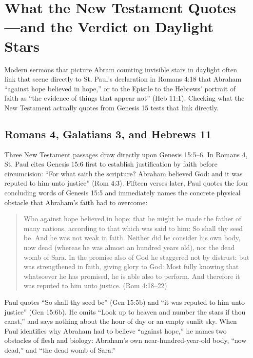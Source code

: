 \section{What the New Testament Quotes---and the Verdict on Daylight Stars}

Modern sermons that picture Abram counting invisible stars in daylight often link that scene directly to St. Paul's declaration in Romans 4:18 that Abraham ``against hope believed in hope,'' or to the Epistle to the Hebrews' portrait of faith as ``the evidence of things that appear not'' (Heb 11:1). Checking what the New Testament actually quotes from Genesis 15 tests that link directly.

\subsection{Romans 4, Galatians 3, and Hebrews 11}

Three New Testament passages draw directly upon Genesis 15:5--6. In Romans 4, St. Paul cites Genesis 15:6 first to establish justification by faith before circumcision: ``For what saith the scripture? Abraham believed God: and it was reputed to him unto justice'' (Rom 4:3). Fifteen verses later, Paul quotes the four concluding words of Genesis 15:5 and immediately names the concrete physical obstacle that Abraham's faith had to overcome:

\begin{quote}
Who against hope believed in hope; that he might be made the father of many nations, according to that which was said to him: So shall thy seed be. And he was not weak in faith. Neither did he consider his own body, now dead (whereas he was almost an hundred years old), nor the dead womb of Sara. In the promise also of God he staggered not by distrust: but was strengthened in faith, giving glory to God: Most fully knowing that whatsoever he has promised, he is able also to perform. And therefore it was reputed to him unto justice. (Rom 4:18--22)
\end{quote}

Paul quotes ``So shall thy seed be'' (Gen 15:5b) and ``it was reputed to him unto justice'' (Gen 15:6b). He omits ``Look up to heaven and number the stars if thou canst,'' and says nothing about the hour of day or an empty sunlit sky. When Paul identifies why Abraham had to believe ``against hope,'' he names two obstacles of flesh and biology: Abraham's own near-hundred-year-old body, ``now dead,'' and ``the dead womb of Sara.''

